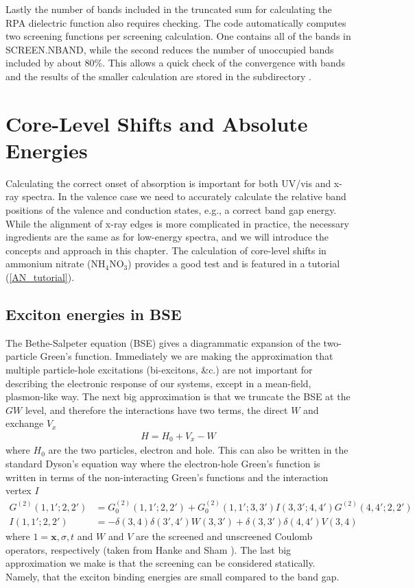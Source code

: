 \documentclass[11pt]{report}
\begin{document}
Lastly the number of bands included in the truncated sum for calculating the RPA dielectric function also requires checking. The code automatically computes two screening functions per screening calculation. One contains all of the bands in SCREEN.NBAND, while the second reduces the number of unoccupied bands included by about 80\%. This allows a quick check of the convergence with bands and the results of the smaller calculation are stored in the subdirectory .


\chapter{Core-Level Shifts and Absolute Energies}

Calculating the correct onset of absorption is important for both UV/vis and x-ray spectra. 
In the valence case we need to accurately calculate the relative band positions of the valence and conduction states, e.g., a correct band gap energy. 
While the alignment of x-ray edges is more complicated in practice, the necessary ingredients are the same as for  low-energy spectra, and we will introduce the concepts and approach in this chapter. 
The calculation of core-level shifts in ammonium nitrate (NH$_4$NO$_3$) provides a good test and is featured in a tutorial (\ref{AN_tutorial}). 

\section{Exciton energies in BSE}
\label{CLS.bse}
The Bethe-Salpeter equation (BSE) gives a diagrammatic expansion of the two-particle Green's function. 
Immediately we are making the approximation that multiple particle-hole excitations (bi-excitons, \&c.) are not important for describing the electronic response of our systems, except in a mean-field, plasmon-like way. 
The next big approximation is that we truncate the BSE at the $GW$ level, and therefore the interactions have two terms, the direct $W$ and exchange $V_x$
\begin{align}
H = H_0 + V_x - W
\end{align}
where $H_0$ are the two particles, electron and hole. 
This can also be written in the standard Dyson's equation way where the electron-hole Green's function is written in terms of the non-interacting Green's functions and the interaction vertex $I$
\begin{align}
G^{(2)}(1,1';2,2') &= G_0^{(2)}(1,1';2,2')  + G_0^{(2)}(1,1';3,3') I(3,3';4,4') G^{(2)}(4,4';2,2') \label{2e-gf} \\
I(1,1';2,2') &= -\delta(3,4) \delta(3',4') W(3,3') + \delta(3,3') \delta(4,4') V(3,4)
\end{align}
where $1=\mathbf{x},\sigma,t$ and $W$ and $V$ are the screened and unscreened Coulomb operators, respectively (taken from Hanke and Sham \cite{PhysRevB.21.4656}). 
The last big approximation we make is that the screening can be considered statically.
Namely, that the exciton binding energies are small compared to the band gap. 
\end{document}
